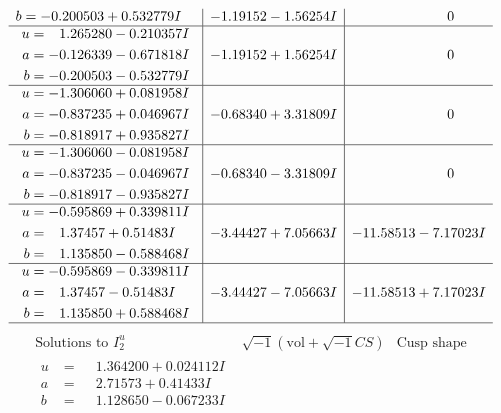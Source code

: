 \documentclass[1p]{elsarticle_modified}
\theoremstyle{definition}
\newcommand{\I}{\sqrt{-1}}
\begin{document}
$$\begin{array}{c|c|c}
\begin{aligned}
b &= -0.200503 + 0.532779 I\end{aligned}
 & -1.19152 - 1.56254 I & \phantom{-0.000000 } 0 \\ \hline\begin{aligned}
u &= \phantom{-}1.265280 - 0.210357 I \\
a &= -0.126339 - 0.671818 I \\
b &= -0.200503 - 0.532779 I\end{aligned}
 & -1.19152 + 1.56254 I & \phantom{-0.000000 } 0 \\ \hline\begin{aligned}
u &= -1.306060 + 0.081958 I \\
a &= -0.837235 + 0.046967 I \\
b &= -0.818917 + 0.935827 I\end{aligned}
 & -0.68340 + 3.31809 I & \phantom{-0.000000 } 0 \\ \hline\begin{aligned}
u &= -1.306060 - 0.081958 I \\
a &= -0.837235 - 0.046967 I \\
b &= -0.818917 - 0.935827 I\end{aligned}
 & -0.68340 - 3.31809 I & \phantom{-0.000000 } 0 \\ \hline\begin{aligned}
u &= -0.595869 + 0.339811 I \\
a &= \phantom{-}1.37457 + 0.51483 I \\
b &= \phantom{-}1.135850 - 0.588468 I\end{aligned}
 & -3.44427 + 7.05663 I & -11.58513 - 7.17023 I \\ \hline\begin{aligned}
u &= -0.595869 - 0.339811 I \\
a &= \phantom{-}1.37457 - 0.51483 I \\
b &= \phantom{-}1.135850 + 0.588468 I\end{aligned}
 & -3.44427 - 7.05663 I & -11.58513 + 7.17023 I\\
 \hline 
 \end{array}$$\newpage$$\begin{array}{c|c|c}  
\text{Solutions to }I^u_{2}& \I (\text{vol} + \sqrt{-1}CS) & \text{Cusp shape}\\
 \hline 
\begin{aligned}
u &= \phantom{-}1.364200 + 0.024112 I \\
a &= \phantom{-}2.71573 + 0.41433 I \\
b &= \phantom{-}1.128650 - 0.067233 I\end{aligned}

\end{array}$$
\end{document}
